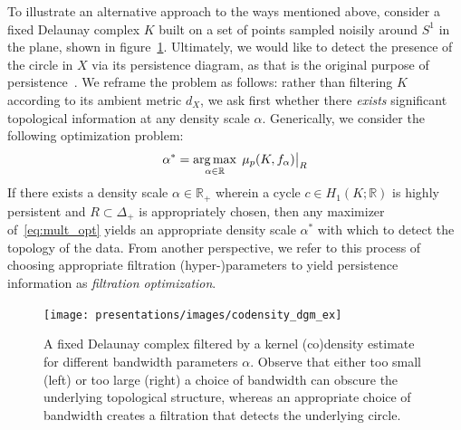 \documentclass[10pt]{article}
\numberwithin{equation}{section}
\newcommand{\+}{%
	\raisebox{0.18ex}{\scaleobj{0.55}{+}}
}
\DeclareMathOperator*{\argmax}{arg\,max}
\newcommand\restr[2]{{%
  \left.\kern-\nulldelimiterspace %
  #1 %
  \vphantom{\big|} %
  \right|_{#2} %
  }}
\theoremstyle{definition}
\theoremstyle{definition}
\begin{document}
To illustrate an alternative approach to the ways mentioned above, consider a fixed Delaunay complex $K$ built on a set of points sampled noisily around $S^1$ in the plane, shown in figure~\ref{fig:codensity}. Ultimately, we would like to detect the presence of the circle in $X$ via its persistence diagram, as that is the original purpose of persistence~\cite{}. 
We reframe the problem as follows: rather than filtering $K$ according to its ambient metric $d_X$, we ask first whether there \emph{exists} significant topological information at any density scale $\alpha$. Generically, we consider the following optimization problem:   
\begin{equation}\label{eq:mult_opt}
	\alpha^\ast = \argmax_{\alpha \in \mathbb{R}} \; 
	\restr{\mu_p(K, f_\alpha)}{R}
\end{equation}
If there exists a density scale $\alpha \in \mathbb{R}_+$ wherein a cycle $c \in H_1(K ; \mathbb{R})$ is highly persistent and $R \subset \Delta_+$ is appropriately chosen, then any maximizer of~\eqref{eq:mult_opt} yields an appropriate density scale $\alpha^\ast$ with which to detect the topology of the data. 
From another perspective, we refer to this process of choosing appropriate filtration (hyper-)parameters to yield persistence information as \emph{filtration optimization}. 

\begin{figure}[ht]
	\centering
	\texttt{[image: presentations/images/codensity\_dgm\_ex]}
	\caption{A fixed Delaunay complex filtered by a kernel (co)density estimate for different bandwidth parameters $\alpha$. Observe that either too small (left) or too large (right) a choice of bandwidth can obscure the underlying topological structure, whereas an appropriate choice of bandwidth creates a filtration that detects the underlying circle. 
	}\label{fig:codensity}
\end{figure}
\end{document}
